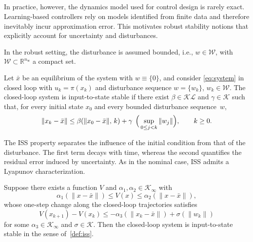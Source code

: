 \subsection{\texorpdfstring{}{Robust Stability}}
In practice, however, the dynamics model used for control design is rarely exact. Learning-based controllers rely on models identified from finite data and therefore inevitably incur approximation error. This motivates robust stability notions that explicitly account for uncertainty and disturbances.

In the robust setting, the disturbance is assumed bounded, i.e., $w\in\mathcal{W}$, with $\mathcal{W}\subset \mathbb{R}^{n_\mathrm{w}}$ a compact set.

\begin{defn}\label{def:iss}
	Let $\bar x$ be an equilibrium of the system with $w \equiv \{0\}$, and consider
	\eqref{eq:system} in closed loop with $u_k = \pi(x_k)$ and disturbance
	sequence $w = \{w_k\}$, $w_k\in\mathcal{W}$. The closed-loop system is input-to-state stable
	if there exist $\beta \in \mathcal{KL}$ and $\gamma \in \mathcal{K}$
	such that, for every initial state $x_0$ and every bounded disturbance
	sequence~$w$,
	\begin{equation*}
		\|x_k - \bar x\|
		\le
		\beta(\|x_0 - \bar x\|,\, k)
		+
		\gamma\:\:\Big(\sup_{0 \le j < k} \|w_j\|\Big),
		\qquad k \ge 0 .
		\vspace{0.5em}
	\end{equation*}
\end{defn}

The ISS property separates the influence of the initial condition from that of the disturbance. The first term decays with time, whereas the second quantifies the residual error induced by uncertainty. %
%
As in the nominal case, ISS admits a Lyapunov characterization.

\begin{thm}\label{thm:iss}
	Suppose there exists a function $V$ and
	$\alpha_1, \alpha_2 \in \mathcal{K}_\infty$ with
	\[
		\alpha_1(\|x - \bar x\|)
		\le
		V(x)
		\le
		\alpha_2(\|x - \bar x\|),
	\]
	whose one-step change along the closed-loop trajectories satisfies
	\begin{equation*}
		V(x_{k+1}) - V(x_k)
		\le
		-\alpha_3(\|x_k - \bar x\|)
		+
		\sigma(\|w_k\|)
	\end{equation*}
	for some $\alpha_3 \in \mathcal{K}_\infty$ and $\sigma \in \mathcal{K}$.
	Then the closed-loop system is input-to-state stable in the sense of~\autoref{def:iss}.
\end{thm}

